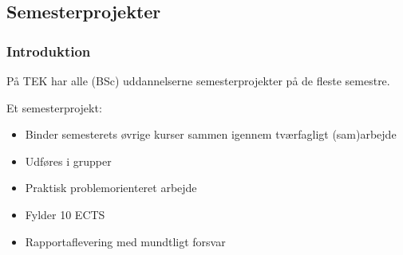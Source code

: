 {\begin{frame}[fragile]
{
  }
\end{frame}

\subsection{Semesterprojekter}
\begin{frame}[fragile]
  \frametitle{Introduktion }
  \vspace{5mm}
  På TEK har alle (BSc) uddannelserne semesterprojekter på de fleste semestre.
  
  \pause
  \vspace{7mm}
  Et semesterprojekt:
  \begin{itemize}
    \item Binder semesterets øvrige kurser sammen igennem tværfagligt (sam)arbejde
    \item Udføres i grupper
    \item Praktisk problemorienteret arbejde
    \item Fylder 10 ECTS
    \item Rapportaflevering med mundtligt forsvar
  \end{itemize}
\end{frame}

}


